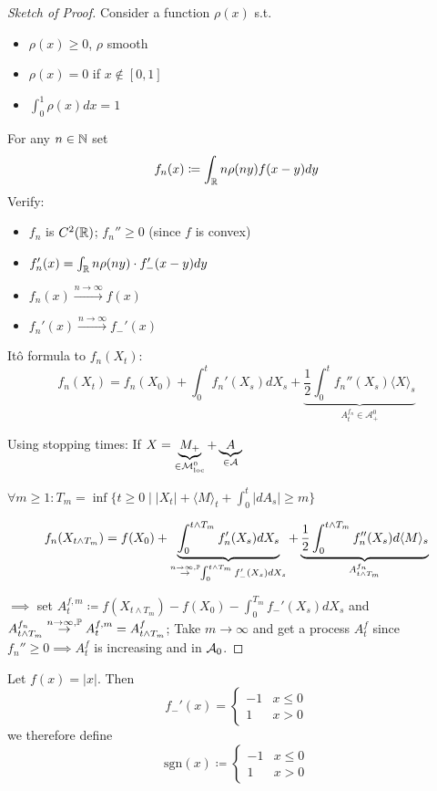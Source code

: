 \begin{proof}[Sketch of Proof]
    Consider a function $\rho(x)$ s.t. 
    \begin{itemize}
        \item $\rho(x)\geq 0$, $\rho$ smooth
        \item $\rho(x)=0$ if $x\notin [0,1]$
        \item $\int_0^1 \rho(x)dx=1$
    \end{itemize}
    For any $n\in\mathbb{N}$ set 
    \[f_n(x)\coloneqq\int_{\mathbb{R}} n\rho(ny)f(x-y)dy\]
    Verify:
    \begin{itemize}
        \item $f_n$ is $C^2(\mathbb{R})$; $f_n''\geq 0$ (since $f$ is convex)
        \item $f_n'(x)=\int_{\mathbb{R}} n\rho(ny)\cdot f_-'(x-y)dy$
        \item $f_n(x)\stackrel{n\to\infty}{\to} f(x)$
        \item $f_n'(x)\stackrel{n\to\infty}{\to} f_-'(x)$ 
    \end{itemize}
    Itô formula to $f_n(X_t)$:
    \[f_n(X_t)=f_n(X_0)+\int_0^t f_n'(X_s)dX_s +\underbrace{\frac{1}{2}\int_0^t f_n''(X_s)\langle X\rangle_s}_{A_t^{f_n}\in \mathcal{A}_+^0}\]

    Using stopping times: If $X=\underbrace{M_+}_{\in \mathcal{M}_{\text{loc}}^0}+\underbrace{A}_{\in\mathcal{A}}$

    $\forall m\geq 1: T_m=\inf\{t\geq 0\mid |X_t|+\langle M \rangle_t +\int_0^t |dA_s|\geq m\}$

    \[f_n(X_{t\land T_m})=f(X_0)+\underbrace{\int_0^{t\land T_m}f_n'(X_s)dX_s}_{\stackrel{n\to\infty,\mathbb{P}}{\to}\int_0^{t\land T_m}f_-'(X_s)dX_s}+\underbrace{\frac{1}{2}\int_0^{t\land T_m}f_n''(X_s)d\langle M\rangle_s}_{A_{t\land T_m}^{f_n}}\]

    $\implies$ set $A_t^{f,m}\coloneqq f(X_{t\land T_m})-f(X_0)-\int_0^{T_m} f_-'(X_s)dX_s$ and 
    $A_{t\land T_m}^{f_n}\stackrel{n\to\infty,\mathbb{P}}{\to}A_t^{f,m}=A_{t\land T_m}^f$; Take $m\to\infty$ and get a process $A_t^f$ since 
    $f_n''\geq 0\implies A_t^f$ is increasing and in $\mathcal{A}_0$.\qedhere
\end{proof}

Let $f(x)=|x|$. Then 
\[f_-'(x)=\begin{cases}
    -1 & x\leq 0\\
    1 & x>0
\end{cases}\]
we therefore define 
\[\text{sgn}(x)\coloneqq\begin{cases}
    -1 & x\leq 0\\
    1 & x>0
\end{cases}\]

